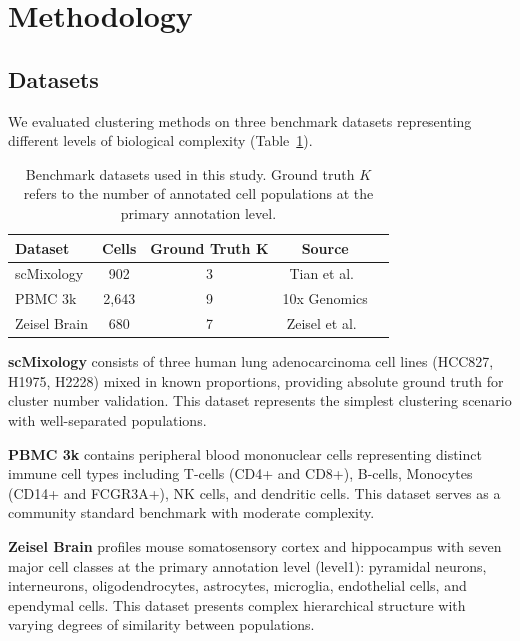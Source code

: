
\section{Methodology}
\label{sec:methods}

\subsection{Datasets}

We evaluated clustering methods on three benchmark datasets representing different levels of biological complexity (Table~\ref{tab:datasets}).

\begin{table}[htbp]
\centering
\caption{Benchmark datasets used in this study. Ground truth $K$ refers to the number of annotated cell populations at the primary annotation level.}
\label{tab:datasets}
\begin{tabular}{@{}lcccc@{}}
\toprule
\textbf{Dataset} & \textbf{Cells} & \textbf{Ground Truth K} & \textbf{Source} \\
\midrule
scMixology & 902 & 3 & Tian et al.~\cite{tian2019scmixology} \\
PBMC 3k & 2,643 & 9 & 10x Genomics \\
Zeisel Brain & 680 & 7 & Zeisel et al.~\cite{zeisel2015brain} \\
\bottomrule
\end{tabular}
\end{table}

\textbf{scMixology} consists of three human lung adenocarcinoma cell lines (HCC827, H1975, H2228) mixed in known proportions, providing absolute ground truth for cluster number validation. This dataset represents the simplest clustering scenario with well-separated populations.

\textbf{PBMC 3k} contains peripheral blood mononuclear cells representing distinct immune cell types including T-cells (CD4+ and CD8+), B-cells, Monocytes (CD14+ and FCGR3A+), NK cells, and dendritic cells. This dataset serves as a community standard benchmark with moderate complexity.

\textbf{Zeisel Brain} profiles mouse somatosensory cortex and hippocampus with seven major cell classes at the primary annotation level (level1): pyramidal neurons, interneurons, oligodendrocytes, astrocytes, microglia, endothelial cells, and ependymal cells. This dataset presents complex hierarchical structure with varying degrees of similarity between populations.

